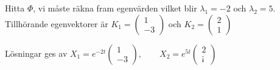 \noindent Hitta $\Phi$, vi måste räkna fram egenvärden vilket blir $\lambda_1=-2$ och $\lambda_2 = 5$. Tillhörande egenvektorer är $K_1 = \begin{pmatrix}1\\-3\end{pmatrix}$ och $K_2 = \begin{pmatrix}2\\1\end{pmatrix}$\par
\noindent Lösningar ges av $X_1 = e^{-2t}\begin{pmatrix}1\\-3\end{pmatrix},\qquad X_2 = e^{5t}\begin{pmatrix}2\\¡\end{pmatrix}$
\par\bigskip


